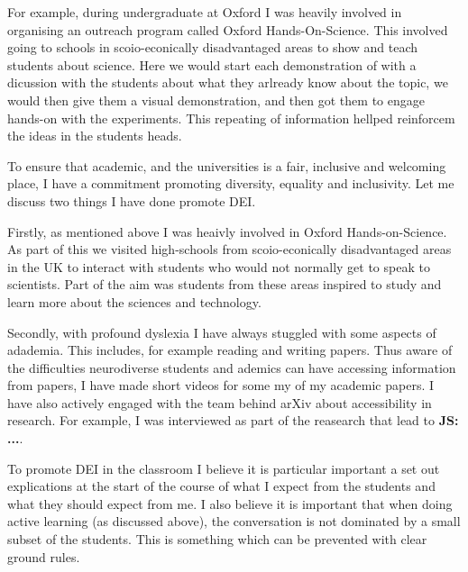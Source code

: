 \documentclass[12pt,letter]{article}
\newcommand{\js}[1]{{\leavevmode\color{magenta}\bf  JS: #1}}
\newcounter{customtitle}
\begin{document}
  For example, during undergraduate at Oxford I was heavily involved in organising an outreach program called Oxford Hands-On-Science. This involved going to schools in scoio-econically disadvantaged areas to show and teach students about science. Here we would start each demonstration of with a dicussion with the students about what they arlready know about the topic, we would then give them a visual demonstration, and then got them to engage hands-on with the experiments. This repeating of information hellped reinforcem the ideas in the students heads. 
  
To ensure that academic, and the universities is a fair, inclusive and welcoming place, I have a commitment promoting diversity, equality and inclusivity. Let me discuss two things I have done promote DEI. 

Firstly, as mentioned above I was heaivly involved in Oxford Hands-on-Science. As part of this we visited high-schools from scoio-econically disadvantaged areas in the UK to interact with students who would not normally get to speak to scientists. Part of the aim was students from these areas inspired to study and learn more about the sciences and technology. 

Secondly, with profound dyslexia I have always stuggled with some aspects of adademia. This includes, for example reading and writing papers. Thus aware of the difficulties neurodiverse students and ademics can have accessing information from papers, I have made short videos for some my of my academic papers. I have also actively engaged with the team behind arXiv about accessibility in research. For example, I was interviewed  as part of the reasearch that lead to \js{...}. 

To promote DEI in the classroom I believe it is particular important a set out explications at the start of the course of what I expect from the students and what they should expect from me. I also believe it is important that when doing active learning (as discussed above), the conversation is not dominated by a small subset of the students. This is something which can be prevented with clear ground rules.  
\end{document}
